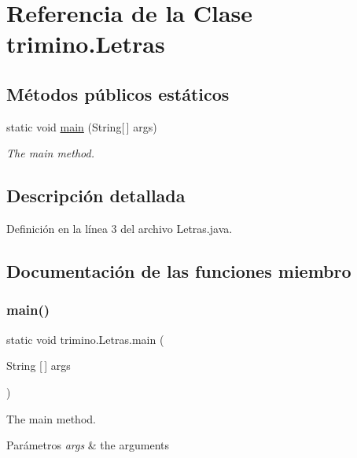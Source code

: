 \hypertarget{classtrimino_1_1Letras}{}\section{Referencia de la Clase trimino.\+Letras}
\label{classtrimino_1_1Letras}
\subsection*{Métodos públicos estáticos}
\begin{DoxyCompactItemize}
\item 
static void \mbox{\hyperlink{classtrimino_1_1Letras_af8d669fe10d2147f8dd60c90d23fa31d}{main}} (String\mbox{[}$\,$\mbox{]} args)
\begin{DoxyCompactList}\small\item\em The main method. \end{DoxyCompactList}\end{DoxyCompactItemize}


\subsection{Descripción detallada}


Definición en la línea 3 del archivo Letras.\+java.



\subsection{Documentación de las funciones miembro}
\mbox{\label{classtrimino_1_1Letras_af8d669fe10d2147f8dd60c90d23fa31d}} 
\subsubsection{\texorpdfstring{main()}{main()}}
{\footnotesize\ttfamily static void trimino.\+Letras.\+main (\begin{DoxyParamCaption}\item[{String \mbox{[}$\,$\mbox{]}}]{args }\end{DoxyParamCaption})\hspace{0.3cm}{\ttfamily [static]}}



The main method. 


\begin{DoxyParams}{Parámetros}
{\em args} & the arguments \\
\hline
\end{DoxyParams}



